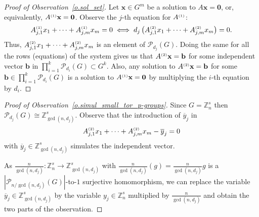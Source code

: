  \begin {proof} 
 [Proof of Observation~\ref {o.sol_set}] Let $\textbf {x}\in G^m$ be a solution to $A\mathbf {x}=\mathbf {0}$, or, equivalently, $A^{\text {\tiny {(1)}}}\mathbf {x}=\mathbf {0}$. Observe the $j$-th equation for $A^{\text {\tiny {(1)}}}$: \begin {displaymath} A^{\text {\tiny {(1)}}}_{j,1}x_1 + \cdots + A^{\text {\tiny {(1)}}}_{j,m} x_m=0 \iff d_j\left (A^{\text {\tiny {(2)}}}_{j,1}x_1+ \cdots + A^{\text {\tiny {(2)}}}_{j,m} x_m\right )=0. \end {displaymath} Thus, $A^{\text {\tiny {(2)}}}_{j,1}x_1+ \cdots + A^{\text {\tiny {(2)}}}_{j,m} x_m$ is an element of $\mathcal {P}_{d_j}(G)$. Doing the same for all the rows (equations) of the system gives us that $A^{\text {\tiny {(2)}}}\mathbf {x}=\mathbf {b}$ for some independent vector $\mathbf {b}$ in $\prod _{i=1}^k \mathcal {P}_{d_i}(G) \subset G^k$. Also, any solution to $A^{\text {\tiny {(2)}}}\mathbf {x}=\mathbf {b}$ for some $\mathbf {b}\in \prod _{i=1}^k \mathcal {P}_{d_i}(G)$ is a solution to $A^{\text {\tiny {(1)}}}\mathbf {x}=\mathbf {0}$ by multiplying the $i$-th equation by $d_i$.
 \end {proof} 
 
 \begin {proof} 
 [Proof of Observation~\ref {o.simul_small_tor_p-groups}] Since $G=\mathbb {Z}_{n}^{s}$ then $\mathcal {P}_{d_j}(G)\cong \mathbb {Z}_{\gcd (n,d_j)}^{s}$. Observe that the introduction of $\overline {y}_j$ in \begin {displaymath} A_{j,1}^{\text {\tiny {(2)}}}x_1+\cdots +A_{j,m}^{\text {\tiny {(2)}}}x_m -\overline {y}_j=0 \end {displaymath} with $\overline {y}_j\in \mathbb {Z}_{\gcd (n,d_j)}^{s}$ simulates the independent vector. \par As $\frac {n}{\gcd (n,d_j)}: \mathbb {Z}_{n}^{s} \to \mathbb {Z}_{\gcd (n,d_j)}^{s}$ with $\frac {n}{\gcd (n,d_j)}(g)=\frac {n}{\gcd (n,d_j)}g$ is a $|\mathcal {P}_{n/\gcd (n,d_j)}(G)|$-to-$1$ surjective homomorphism, we can replace the variable $\overline {y}_j\in \mathbb {Z}_{\gcd (n,d_j)}^{s}$ by the variable $y_j\in \mathbb {Z}_{n}^{s}$ multiplied by $\frac {n}{\gcd (n,d_j)}$ and obtain the two parts of the observation.
 \end {proof} 
 
